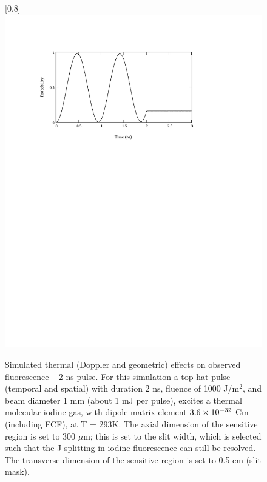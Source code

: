 \begin{figure}
\scalebox{0.8}[0.8]{
\includegraphics[bb=10 490 550 690]
{thermal_2/thermal_2.pdf}
}
\caption[Simulated thermal (Doppler and geometric) effects on observed fluorescence -- 2 ns pulse]{Simulated thermal (Doppler and geometric) effects on observed fluorescence -- 2 ns pulse. For this simulation a top hat pulse (temporal and spatial) with duration 2 ns, fluence of 1000 J/m$^2$, and beam diameter 1 mm (about 1 mJ per pulse), excites a thermal molecular iodine gas, with dipole matrix element $3.6\times10^{-32}$ Cm (including FCF), at T = 293K.  The axial dimension of the sensitive region is set to 300 $\mu$m; this is set to the slit width, which is selected such that the J-splitting in iodine fluorescence can still be resolved. The transverse dimension of the sensitive region is set to 0.5 cm (slit mask).}
\label{thermal_2}
\end{figure}
